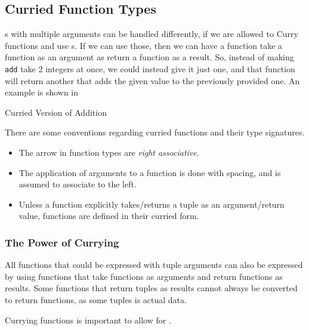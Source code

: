\subsection{Curried Function Types}\label{subsec:Curried_Function_Types}
s with multiple arguments can be handled differently, if we are allowed to Curry functions and use s.
If we can use those, then we can have a function take a function as an argument as return a function as a result.
So, instead of making \texttt{add} take 2 integers at once, we could instead give it just one, and that function will return another that adds the given value to the previously provided one.
An example is shown in 

\begin{listing}[h!tbp]
\caption{Curried Version of Addition}
\label{lst:Curried_Add_Example}
\end{listing}

There are some conventions regarding curried functions and their type signatures.
\begin{itemize}[noitemsep]
\item The arrow in function types are \emph{right associative}.
\item The application of arguments to a function is done with spacing, and is assumed to associate to the left.
\item Unless a function explicitly takes/returns a tuple as an argument/return value, functions are defined in their curried form.
\end{itemize}

\subsubsection{The Power of Currying}\label{subsubsec:Power_of_Currying}
All functions that could be expressed with tuple arguments can also be expressed by using functions that take functions as arguments and return functions as results.
Some functions that return tuples as results cannot always be converted to return functions, as some tuples is actual data.

Currying functions is important to allow for .

